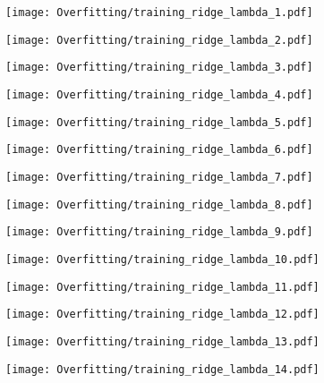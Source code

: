 \documentclass[xcolor=pdftex,dvipsnames,table]{beamer}
\begin{document}
\frame
{
	\begin{center}
		\texttt{[image: Overfitting/training\_ridge\_lambda\_1.pdf]}
	\end{center}
}
\frame
{
	\begin{center}
		\texttt{[image: Overfitting/training\_ridge\_lambda\_2.pdf]}
	\end{center}
}
\frame
{
	\begin{center}
		\texttt{[image: Overfitting/training\_ridge\_lambda\_3.pdf]}
	\end{center}
}
\frame
{
	\begin{center}
		\texttt{[image: Overfitting/training\_ridge\_lambda\_4.pdf]}
	\end{center}
}
\frame
{
	\begin{center}
		\texttt{[image: Overfitting/training\_ridge\_lambda\_5.pdf]}
	\end{center}
}
\frame
{
	\begin{center}
		\texttt{[image: Overfitting/training\_ridge\_lambda\_6.pdf]}
	\end{center}
}
\frame
{
	\begin{center}
		\texttt{[image: Overfitting/training\_ridge\_lambda\_7.pdf]}
	\end{center}
}
\frame
{
	\begin{center}
		\texttt{[image: Overfitting/training\_ridge\_lambda\_8.pdf]}
	\end{center}
}
\frame
{
	\begin{center}
		\texttt{[image: Overfitting/training\_ridge\_lambda\_9.pdf]}
	\end{center}
}
\frame
{
	\begin{center}
		\texttt{[image: Overfitting/training\_ridge\_lambda\_10.pdf]}
	\end{center}
}
\frame
{
	\begin{center}
		\texttt{[image: Overfitting/training\_ridge\_lambda\_11.pdf]}
	\end{center}
}
\frame
{
	\begin{center}
		\texttt{[image: Overfitting/training\_ridge\_lambda\_12.pdf]}
	\end{center}
}
\frame
{
	\begin{center}
		\texttt{[image: Overfitting/training\_ridge\_lambda\_13.pdf]}
	\end{center}
}
\frame
{
	\begin{center}
		\texttt{[image: Overfitting/training\_ridge\_lambda\_14.pdf]}
	\end{center}
}
\end{document}
